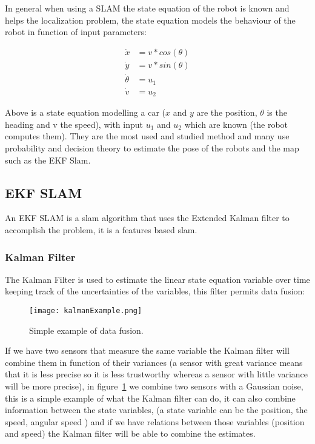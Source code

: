 In general when using a SLAM the state equation of the robot is known and helps the localization problem, the state equation models the behaviour of the robot in function of input parameters:

\begin{align}
\dot{x} &= v*cos(\theta)\\
\dot{y} &= v*sin(\theta)\\
\dot{\theta} &= u_{1}\\
\dot{v} &= u_{2}
\end{align}

Above is a state equation modelling a car ($x$ and $y$ are the position, $\theta$ is the heading and v the speed), with input $u_{1}$ and $u_{2}$ which are known (the robot computes them).
They are the most used and studied method and many use probability and decision theory to estimate the pose of the robots and the map such as the EKF Slam.

\subsection{EKF SLAM}
An EKF SLAM is a slam algorithm that uses the Extended Kalman filter to accomplish the problem, it is a features based slam.

\subsubsection{Kalman Filter}

The Kalman Filter is used to estimate the linear state equation variable over time keeping track of the uncertainties of the variables, this filter permits data fusion:

\begin{figure}[H]
\centering
    \texttt{[image: kalmanExample.png]} 
    \caption{Simple example of data fusion.}
    \label{fig:kalexample}
\end{figure}

If we have two sensors that measure the same variable the Kalman filter will combine them in function of their variances (a sensor with great variance means that it is less precise so it is less trustworthy whereas a sensor with little variance will be more precise), in figure~\ref{fig:kalexample} we combine two sensors with a Gaussian noise, this is a simple example of what the Kalman filter can do, it can also combine information between the state variables, (a state variable can be the position, the speed, angular speed ) and if we have relations between those variables (position and speed) the Kalman filter will be able to combine the estimates.\\

